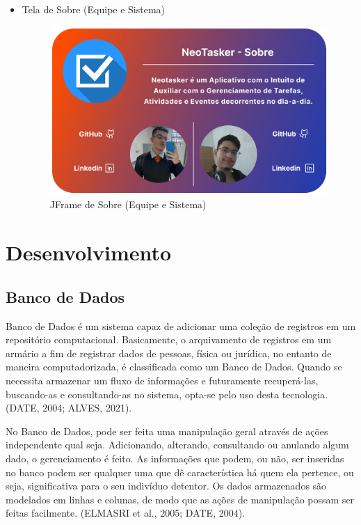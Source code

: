 \documentclass[a4paper,12pt]{article}
\begin{document}
\begin{itemize}
	\item Tela de Sobre (Equipe e Sistema)
	\begin{figure}[H]
		\centering
		\includegraphics[scale=0.20]{prototypes/white/About Us Panel Window.png}
		\caption{JFrame de Sobre (Equipe e Sistema)}
	\end{figure}
\end{itemize}


\pagebreak
\section{Desenvolvimento}


\subsection{Banco de Dados}
Banco de Dados é um sistema capaz de adicionar uma coleção de registros em um repositório computacional. Basicamente, o arquivamento de 
registros em um armário a fim de registrar dados de pessoas, física ou jurídica, no entanto de maneira computadorizada, é classificada 
como um Banco de Dados. Quando se necessita armazenar um fluxo de informações e futuramente recuperá-las, buscando-as e consultando-as 
no sistema, opta-se pelo uso desta tecnologia. (DATE, 2004; ALVES, 2021).

No Banco de Dados, pode ser feita uma manipulação geral através de ações independente qual seja. Adicionando, alterando, consultando 
ou anulando algum dado, o gerenciamento é feito. As informações que podem, ou não, ser inseridas no banco podem ser qualquer uma que 
dê característica há quem ela pertence, ou seja, significativa para o seu indivíduo detentor. Os dados armazenados são modelados em 
linhas e colunas, de modo que as ações de manipulação possam ser feitas facilmente. (ELMASRI et al., 2005; DATE, 2004).
\end{document}
